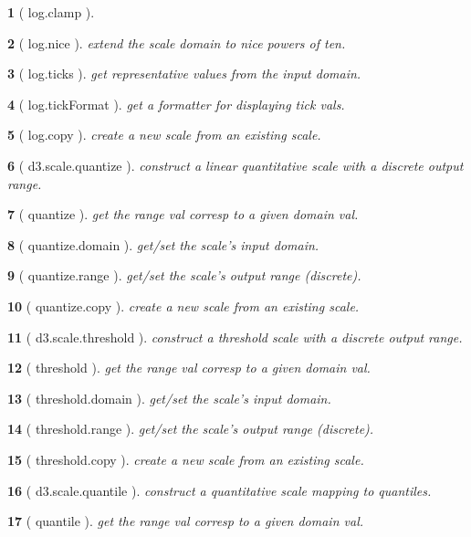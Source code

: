 \documentclass[10pt,landscape,letterpaper]{article}
\newcounter{thm}
\theoremstyle{mytheoremstyle}
\newtheorem*{thm}{}
\begin{document}
\begin{multicols}{3}
\begin{thm} [ log.clamp ]
\end{thm}\begin{thm} [ log.nice ]  extend the scale domain to nice powers of ten.
\end{thm}\begin{thm} [ log.ticks ]  get representative values from the input domain.
\end{thm}\begin{thm} [ log.tickFormat ]  get a formatter for displaying tick vals.
\end{thm}\begin{thm} [ log.copy ]  create a new scale from an existing scale.
\end{thm}\begin{thm} [ d3.scale.quantize ]  construct a linear quantitative scale with a discrete output range.
\end{thm}\begin{thm} [ quantize ]  get the range val corresp to a given domain val.
\end{thm}\begin{thm} [ quantize.domain ]  get/set the scale's input domain.
\end{thm}\begin{thm} [ quantize.range ]  get/set the scale's output range (discrete).
\end{thm}\begin{thm} [ quantize.copy ]  create a new scale from an existing scale.
\end{thm}\begin{thm} [ d3.scale.threshold ]  construct a threshold scale with a discrete output range.
\end{thm}\begin{thm} [ threshold ]  get the range val corresp to a given domain val.
\end{thm}\begin{thm} [ threshold.domain ]  get/set the scale's input domain.
\end{thm}\begin{thm} [ threshold.range ]  get/set the scale's output range (discrete).
\end{thm}\begin{thm} [ threshold.copy ]  create a new scale from an existing scale.
\end{thm}\begin{thm} [ d3.scale.quantile ]  construct a quantitative scale mapping to quantiles.
\end{thm}\begin{thm} [ quantile ]  get the range val corresp to a given domain val.

\end{thm}
\end{multicols}
\end{document}
